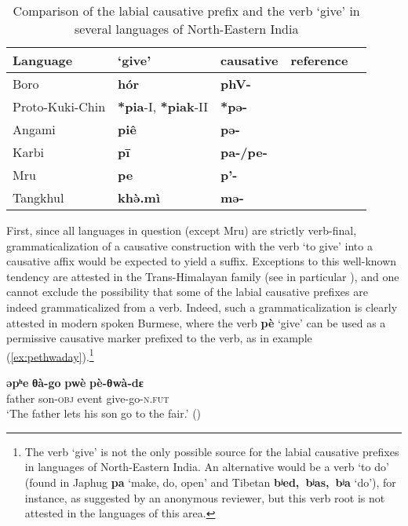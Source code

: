 \documentclass[oneside,a4paper,11pt]{article}
\newcommand{\ipa}[1]{\textbf{{\phon\mbox{#1}}}} %
\newcommand{\forme}[2]{\ipa{#1} `#2'}
\begin{document}
\begin{table}[H]
\caption{Comparison of the labial causative prefix and the verb `give' in several languages of North-Eastern India} \label{tab:give}
\begin{tabular}{lllll}
\toprule
Language &  `give' & causative & reference \\
\midrule
Boro & \ipa{hór} & \ipa{phV-} & \\
Proto-Kuki-Chin & 	\ipa{*pia}-I, \ipa{*piak}-II & 	\ipa{*pə-} & 	\citet[89]{vanbik09pkc} \\ 
Angami & 	\ipa{piê} & 	\ipa{pə-} & 	\citet[77]{giridhar80angami} \\ 
Karbi & 	\ipa{pī} & 	\ipa{pa-/pe-} & 	\citet{konnerth14karbi} \\ 
Mru & 	\ipa{pe} & 	\ipa{p'-} & 	\citet{williams08directionals} \\ 
Tangkhul & 	\ipa{khə̀.mì } & 	\ipa{mə-} & 	\citet[37]{mortensen03tangkhul} \\ 
\bottomrule
\end{tabular}
\end{table}

First, since all languages in question (except Mru) are strictly verb-final, grammaticalization of a causative construction with the verb `to give' into a causative affix would be expected to yield a suffix. Exceptions to this well-known tendency are attested in the Trans-Himalayan family (see in particular \citealt{jacques13harmonization}), and one cannot exclude the possibility that some of the labial causative prefixes are indeed grammaticalized from a verb.  Indeed, such a grammaticalization is clearly attested in modern spoken Burmese, where the verb \ipa{pè} `give' can be used as a permissive causative marker prefixed to the verb, as in example (\ref{ex:pethwaday}).\footnote{The verb `give' is not the only possible source for the labial causative prefixes in languages of North-Eastern India. An alternative would be a verb `to do' (found in Japhug \forme{pa}{make, do, open} and Tibetan \forme{bʲed, bʲas, bʲa}{do}), for instance, as suggested by an anonymous reviewer, but this verb root is not attested in the languages of this area. }

\begin{exe}
\ex \label{ex:pethwaday}
\gll \ipa{əpʰe} \ipa{θà-go} \ipa{pwè} \ipa{pè-θwà-dɛ} \\
father son-\textsc{obj} event give-go-\textsc{n.fut} \\
\glt `The father lets his son go to the fair.' (\citealt[196]{jenny16grammar})
\end{exe}
\end{document}
